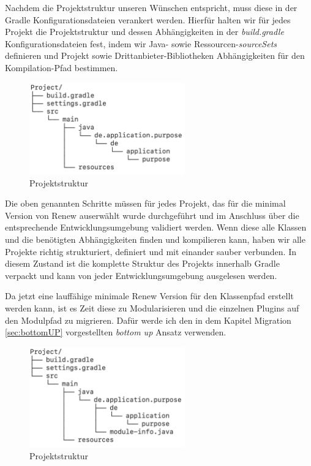 Nachdem die Projektstruktur unseren Wünschen entspricht, muss diese in der Gradle Konfigurationsdateien verankert werden. Hierfür halten wir für jedes Projekt die Projektstruktur und dessen Abhängigkeiten in der \textit{build.gradle} Konfigurationsdateien fest, indem wir Java- sowie Ressourcen-\textit{sourceSets} definieren und Projekt sowie Drittanbieter-Bibliotheken Abhängigkeiten für den  Kompilation-Pfad bestimmen.

\begin{figure}[h!]
  \centering
  \includegraphics[width=0.6\textwidth]{material/images/gradle_project.png}
  \caption{Projektstruktur}
  \label{fig:projektstruktur}
\end{figure}

 Die oben genannten Schritte müssen für jedes Projekt, das für die minimal Version von Renew auserwählt wurde durchgeführt und im Anschluss über die entsprechende Entwicklungsumgebung  validiert werden. Wenn diese alle Klassen und die benötigten Abhängigkeiten finden und kompilieren kann, haben wir alle Projekte richtig strukturiert, definiert und mit einander sauber verbunden. In diesem Zustand ist die komplette Struktur des Projekts innerhalb Gradle verpackt und kann von jeder Entwicklungsumgebung ausgelesen werden. 


Da jetzt eine lauffähige minimale Renew Version für den Klassenpfad erstellt werden kann, ist es Zeit diese zu Modularisieren und die einzelnen Plugins auf den Modulpfad zu migrieren. Dafür werde ich den in dem Kapitel Migration \ref{sec:bottomUP} vorgestellten \textit{bottom up} Ansatz verwenden. 

\begin{figure}[h!]
  \centering
  \includegraphics[width=0.6\textwidth]{material/images/module_project.png}
  \caption{Projektstruktur}
  \label{fig:projektstruktur}
\end{figure}

